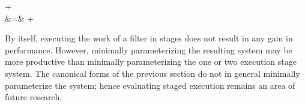 + 
 \\
 &\hspace{-6pt}=\hspace{-6pt}& 
 +  
\doneeqnstar

By itself, executing the work of a filter in stages does not result in
any gain in performance. However, minimally parameterizing the
resulting system may be more productive than minimally parameterizing
the one or two execution stage system.  The canonical forms of the
previous section do not in general minimally parameterize the system;
hence evaluating staged execution remains an area of future research.
